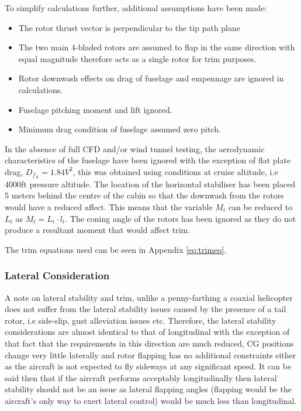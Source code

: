 \documentclass[11pt,a4paper]{article}
\begin{document}
To simplify calculations further, additional assumptions have been made:

\begin{itemize}
    \item The rotor thrust vector is perpendicular to the tip path plane
    \item The two main 4-bladed rotors are assumed to flap in the same direction with equal magnitude therefore acts as a single rotor for trim purposes.
    \item Rotor downwash effects on drag of fuselage and empennage are ignored in calculations.
    \item Fuselage pitching moment and lift ignored.
    \item Minimum drag condition of fuselage assumed zero pitch.
\end{itemize}{}

In the absence of full CFD and/or wind tunnel testing, the aerodynamic characteristics of the fuselage have been ignored with the exception of flat plate drag, $D_{f_X}=1.84V^2$, this was obtained using conditions at cruise altitude, i.e 4000ft pressure altitude.
The location of the horizontal stabiliser has been placed 5 meters behind the centre of the cabin so that the downwash from the rotors would have a reduced affect. This means that the variable $M_t$ can be reduced to $L_t$ as $M_t=L_t\cdot l_t$. The coning angle of the rotors has been ignored as they do not produce a resultant moment that would affect trim.

The trim equations used can be seen in Appendix \ref{eq:trimeq}.
%
\subsubsection{Lateral Consideration}
A note on lateral stability and trim, unlike a penny-farthing a coaxial helicopter does not suffer from the lateral stability issues caused by the presence of a tail rotor, i.e side-slip, gust alleviation issues etc. Therefore, the lateral stability considerations are almost identical to that of longitudinal with the exception of that fact that the requirements in this direction are much reduced, CG positions change very little laterally and rotor flapping has no additional constraints either as the aircraft is not expected to fly sideways at any significant speed.
It can be said then that if the aircraft performs acceptably longitudinally then lateral stability should not be an issue as lateral flapping angles (flapping would be the aircraft's only way to exert lateral control) would be much less than longitudinal.
\end{document}
